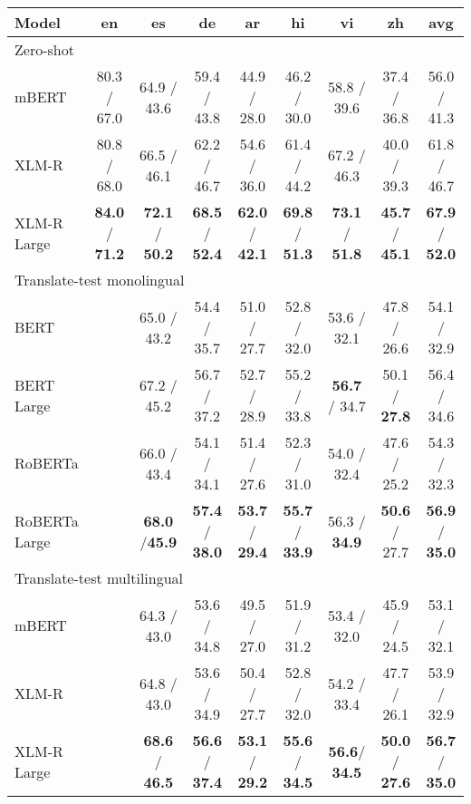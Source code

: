 \documentclass[11pt]{article}
\begin{document}
\begin{table*}[!ht]
    \centering
    \begin{adjustbox}{max width=\textwidth}
    \begin{tabular}{l|ccccccc|c}
        \toprule
        Model & en & es & de & ar & hi & vi & zh & avg \\
        \midrule
        \multicolumn{9}{l}{Zero-shot} \\
        \midrule
        mBERT & 80.3 / 67.0 & 64.9 / 43.6 & 59.4 / 43.8 & 44.9 / 28.0 & 46.2 / 30.0 & 58.8 / 39.6 & 37.4 / 36.8 & 56.0 / 41.3 \\
        XLM-R & 80.8 / 68.0 & 66.5 / 46.1 & 62.2 / 46.7 & 54.6 / 36.0 & 61.4 / 44.2 & 67.2 / 46.3 & 40.0 / 39.3 & 61.8 / 46.7 \\
        XLM-R Large & \textbf{84.0} / \textbf{71.2} & \textbf{72.1} / \textbf{50.2} & \textbf{68.5} / \textbf{52.4} & \textbf{62.0} / \textbf{42.1} & \textbf{69.8} / \textbf{51.3} & \textbf{73.1} / \textbf{51.8} & \textbf{45.7} / \textbf{45.1} & \textbf{67.9} / \textbf{52.0} \\
        \midrule
        \multicolumn{9}{l}{Translate-test monolingual} \\
        \midrule
        BERT & ~ & 65.0 / 43.2 & 54.4 / 35.7 & 51.0 / 27.7 & 52.8 / 32.0 & 53.6 / 32.1 & 47.8 / 26.6 & 54.1 / 32.9 \\
        BERT Large & ~ & 67.2 / 45.2 & 56.7 / 37.2 & 52.7 / 28.9 & 55.2 / 33.8 & \textbf{56.7} / 34.7 & 50.1 / \textbf{27.8} & 56.4 / 34.6 \\
        RoBERTa & ~ & 66.0 / 43.4 & 54.1 / 34.1 & 51.4 / 27.6 & 52.3 / 31.0 & 54.0 / 32.4 & 47.6 / 25.2 & 54.3 / 32.3 \\
        RoBERTa Large & ~ &\textbf{68.0} /\textbf{45.9} & \textbf{57.4} / \textbf{38.0} & \textbf{53.7} / \textbf{29.4} & \textbf{55.7} / \textbf{33.9} & 56.3 / \textbf{34.9} & \textbf{50.6} / 27.7 & \textbf{56.9} / \textbf{35.0}\\
        \midrule
        \multicolumn{9}{l}{Translate-test multilingual} \\
        \midrule
        mBERT & ~ & 64.3 / 43.0 & 53.6 / 34.8 & 49.5 / 27.0 & 51.9 / 31.2 & 53.4 / 32.0 & 45.9 / 24.5 & 53.1 / 32.1 \\
        XLM-R & ~ &64.8 / 43.0 & 53.6 / 34.9 & 50.4 / 27.7 & 52.8 / 32.0 & 54.2 / 33.4 & 47.7 / 26.1 & 53.9 / 32.9 \\
        XLM-R Large & ~ & \textbf{68.6} / \textbf{46.5} & \textbf{56.6} / \textbf{37.4} & \textbf{53.1} / \textbf{29.2} & \textbf{55.6} / \textbf{34.5} & \textbf{56.6}/ \textbf{34.5} & \textbf{50.0} / \textbf{27.6} & \textbf{56.7} / \textbf{35.0} \\

\end{tabular}
\end{adjustbox}
\end{table*}
\end{document}
